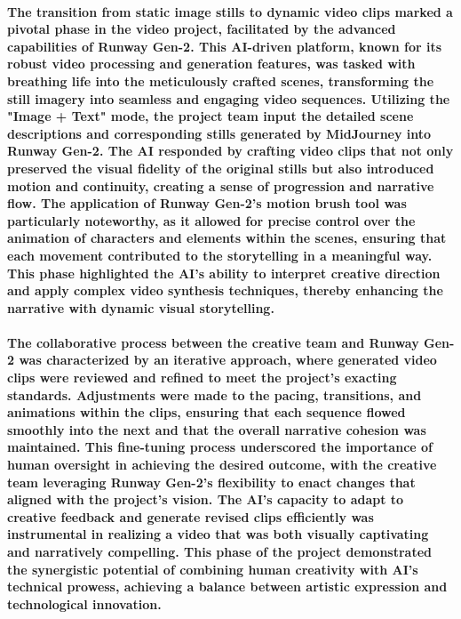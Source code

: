 \documentclass[11pt,a4paper,oneside]{report}
\begin{document}
\paragraph{The transition from static image stills to dynamic video clips marked a pivotal phase in the video project, facilitated by the advanced capabilities of Runway Gen-2. This AI-driven platform, known for its robust video processing and generation features, was tasked with breathing life into the meticulously crafted scenes, transforming the still imagery into seamless and engaging video sequences. Utilizing the "Image + Text" mode, the project team input the detailed scene descriptions and corresponding stills generated by MidJourney into Runway Gen-2. The AI responded by crafting video clips that not only preserved the visual fidelity of the original stills but also introduced motion and continuity, creating a sense of progression and narrative flow. The application of Runway Gen-2's motion brush tool was particularly noteworthy, as it allowed for precise control over the animation of characters and elements within the scenes, ensuring that each movement contributed to the storytelling in a meaningful way. This phase highlighted the AI's ability to interpret creative direction and apply complex video synthesis techniques, thereby enhancing the narrative with dynamic visual storytelling.}

\paragraph{The collaborative process between the creative team and Runway Gen-2 was characterized by an iterative approach, where generated video clips were reviewed and refined to meet the project's exacting standards. Adjustments were made to the pacing, transitions, and animations within the clips, ensuring that each sequence flowed smoothly into the next and that the overall narrative cohesion was maintained. This fine-tuning process underscored the importance of human oversight in achieving the desired outcome, with the creative team leveraging Runway Gen-2's flexibility to enact changes that aligned with the project's vision. The AI's capacity to adapt to creative feedback and generate revised clips efficiently was instrumental in realizing a video that was both visually captivating and narratively compelling. This phase of the project demonstrated the synergistic potential of combining human creativity with AI's technical prowess, achieving a balance between artistic expression and technological innovation.}
\end{document}
